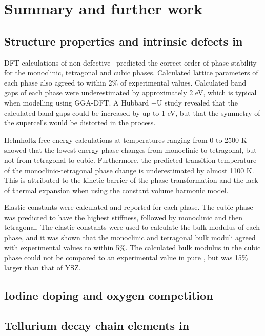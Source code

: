 \chapter{Summary and further work}

\label{ch:summary}

\section{Structure properties and intrinsic defects in \zirconia}

DFT calculations of non-defective \zirconia\ predicted the correct order of phase stability for the monoclinic, tetragonal and cubic phases. Calculated lattice parameters of each phase also agreed to within 2\% of experimental values. Calculated band gaps of each phase were underestimated by approximately 2 eV, which is typical when modelling using GGA-DFT. A Hubbard +U study revealed that the calculated band gaps could be increased by up to 1 eV, but that the symmetry of the supercells would be distorted in the process.

Helmholtz free energy calculations at temperatures ranging from 0 to 2500 K showed that the lowest energy phase changes from monoclinic to tetragonal, but not from tetragonal to cubic. Furthermore, the predicted transition temperature of the monoclinic-tetragonal phase change is underestimated by almost 1100 K. This is attributed to the kinetic barrier of the phase transformation and the lack of thermal expansion when using the constant volume harmonic model.

Elastic constants were calculated and reported for each phase. The cubic phase was predicted to have the highest stiffness, followed by monoclinic and then tetragonal. The elastic constants were used to calculate the bulk modulus of each phase, and it was shown that the monoclinic and tetragonal bulk moduli agreed with experimental values to within 5\%. The calculated bulk modulus in the cubic phase could not be compared to an experimental value in pure \zirconia , but was 15\% larger than that of YSZ.

\section{Iodine doping and oxygen competition}

\section{Tellurium decay chain elements in \zirconia}

